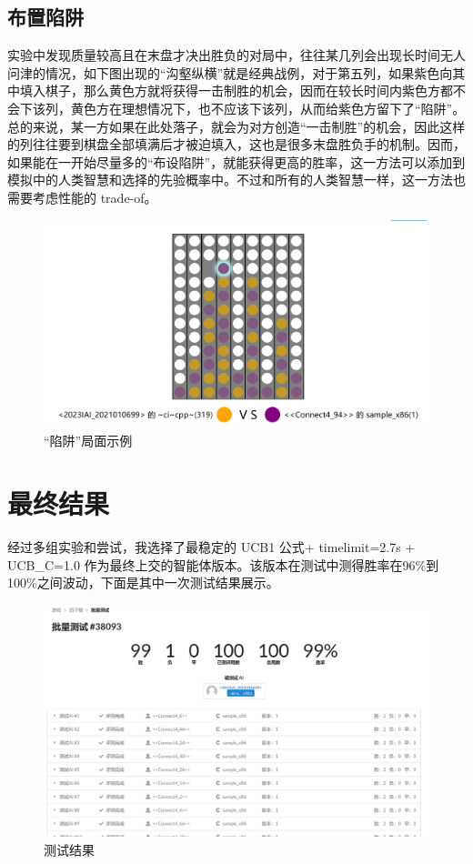 \documentclass{article}
\begin{document}
\begin{spacing}{1.1}
	\subsection{布置陷阱}
	\hspace{1.4em}
	实验中发现质量较高且在末盘才决出胜负的对局中，往往某几列会出现长时间无人问津的情况，如下图出现的“沟壑纵横”就是经典战例，对于第五列，如果紫色向其中填入棋子，那么黄色方就将获得一击制胜的机会，因而在较长时间内紫色方都不会下该列，黄色方在理想情况下，也不应该下该列，从而给紫色方留下了“陷阱”。总的来说，某一方如果在此处落子，就会为对方创造“一击制胜”的机会，因此这样的列往往要到棋盘全部填满后才被迫填入，这也是很多末盘胜负手的机制。因而，如果能在一开始尽量多的“布设陷阱”，就能获得更高的胜率，这一方法可以添加到模拟中的人类智慧和选择的先验概率中。不过和所有的人类智慧一样，这一方法也需要考虑性能的 trade-of。
	\begin{figure}[h]
		\centering
		\includegraphics[width=0.8\linewidth]{pic/Trap.png}
		\caption{“陷阱”局面示例}
	\end{figure}
\section{最终结果}
	\hspace{1.4em}
	经过多组实验和尝试，我选择了最稳定的 UCB1 公式+ timelimit=2.7s + UCB\_C=1.0 作为最终上交的智能体版本。该版本在测试中测得胜率在96\%到100\%之间波动，下面是其中一次测试结果展示。
	\begin{figure}[h]
		\centering
		\includegraphics[width=0.8\linewidth]{pic/result.png}
		\caption{测试结果}
	\end{figure}

\end{spacing}
\end{document}
